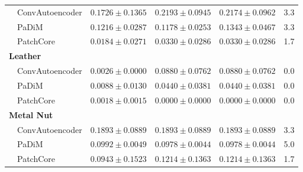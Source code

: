 \begin{table}[htbp]
{\begin{tabular}{llcccc}
 & ConvAutoencoder & $0.1726 \pm 0.1365$ & $0.2193 \pm 0.0945$ & $0.2174 \pm 0.0962$ & 3.3 \\
 & PaDiM & $0.1216 \pm 0.0287$ & $0.1178 \pm 0.0253$ & $0.1343 \pm 0.0467$ & 3.3 \\
 & PatchCore & $0.0184 \pm 0.0271$ & $0.0330 \pm 0.0286$ & $0.0330 \pm 0.0286$ & 1.7 \\
\midrule
\multicolumn{6}{l}{\textbf{Leather}} \\
 & ConvAutoencoder & $0.0026 \pm 0.0000$ & $0.0880 \pm 0.0762$ & $0.0880 \pm 0.0762$ & 0.0 \\
 & PaDiM & $0.0088 \pm 0.0130$ & $0.0440 \pm 0.0381$ & $0.0440 \pm 0.0381$ & 0.0 \\
 & PatchCore & $0.0018 \pm 0.0015$ & $0.0000 \pm 0.0000$ & $0.0000 \pm 0.0000$ & 0.0 \\
\midrule
\multicolumn{6}{l}{\textbf{Metal Nut}} \\
 & ConvAutoencoder & $0.1893 \pm 0.0889$ & $0.1893 \pm 0.0889$ & $0.1893 \pm 0.0889$ & 3.3 \\
 & PaDiM & $0.0992 \pm 0.0049$ & $0.0978 \pm 0.0044$ & $0.0978 \pm 0.0044$ & 5.0 \\
 & PatchCore & $0.0943 \pm 0.1523$ & $0.1214 \pm 0.1363$ & $0.1214 \pm 0.1363$ & 1.7 \\
\bottomrule
\end{tabular}}
\end{table}
